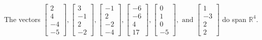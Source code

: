 \begin{exercise}
\begin{exerciseStatement}
  \end{exerciseStatement}
  \begin{exerciseAnswer}
   The vectors \(\left[\begin{array}{r}
2 \\
4 \\
-4 \\
-5
\end{array}\right] , \left[\begin{array}{r}
3 \\
-1 \\
2 \\
-2
\end{array}\right] , \left[\begin{array}{r}
-1 \\
2 \\
-2 \\
-4
\end{array}\right] , \left[\begin{array}{r}
-6 \\
-6 \\
4 \\
17
\end{array}\right] , \left[\begin{array}{r}
0 \\
1 \\
0 \\
-5
\end{array}\right] , \text{ and } \left[\begin{array}{r}
1 \\
-3 \\
2 \\
2
\end{array}\right]\) 
  	 do  
	span \(\mathbb{R}^4\).
  


  \end{exerciseAnswer}
\end{exercise}